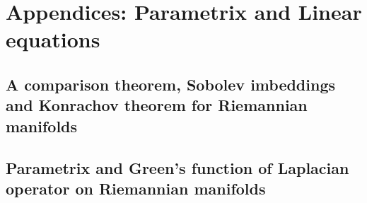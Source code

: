 \documentclass[11pt]{book}
\begin{document}
\part{Appendices: Parametrix and Linear equations}
\chapter[Sobolev spaces on Riemannian manifolds]{A comparison theorem, Sobolev imbeddings and Konrachov theorem for Riemannian manifolds}


\chapter[Parametrix and Green's function]{Parametrix and Green's function of Laplacian operator on Riemannian manifolds }




\end{document}

